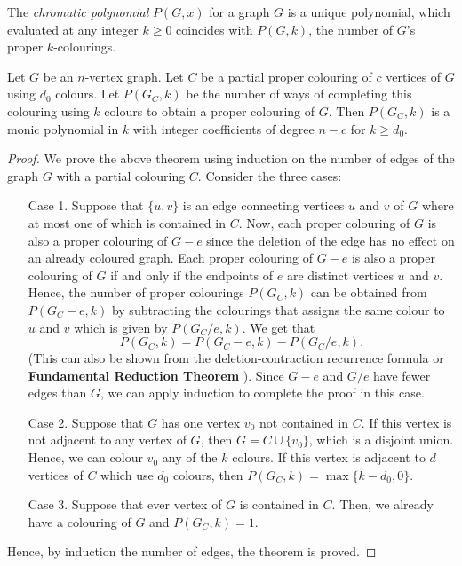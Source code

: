 \documentclass[../main.tex]{subfiles}
\begin{document}
    \begin{definition}
        The \emph{chromatic polynomial} $P(G,x)$ for a graph $G$ is a unique polynomial, which evaluated at any integer $k\geq0$ coincides with $P(G,k)$, the number of $G$'s proper $k$-colourings.
    \end{definition}
    \begin{theorem}
        Let $G$ be an $n$-vertex graph. Let $C$ be a partial proper colouring of $c$ vertices of $G$ using $d_0$ colours. Let $P(G_C,k)$ be the number of ways of completing this colouring using $k$ colours to obtain a proper colouring of $G$. Then $P(G_C,k)$ is a monic polynomial in $k$ with integer coefficients of degree $n-c$ for $k\geq d_0$.
    \end{theorem}
    \begin{proof}
        We prove the above theorem using induction on the number of edges of the graph $G$ with a partial colouring $C$. Consider the three cases:
        \begin{enumerate}
            \item[Case 1.] Suppose that $\{u,v\}$ is an edge connecting vertices $u$ and $v$ of $G$ where at most one of which is contained in $C$. Now, each proper colouring of $G$ is also a proper colouring of $G-e$ since the deletion of the edge has no effect on an already coloured graph. Each proper colouring of $G-e$ is also a proper colouring of $G$ if and only if the endpoints of $e$ are distinct vertices $u$ and $v$. Hence, the number of proper colourings $P(G_C, k)$ can be obtained from $P(G_C-e,k)$ by subtracting the colourings that assigns the same colour to $u$ and $v$ which is given by $P(G_C/e,k)$. We get that
            $$P(G_C,k) = P(G_C-e,k)-P(G_C/e, k).$$
            (This can also be shown from the deletion-contraction recurrence formula or \textbf{Fundamental Reduction Theorem} \cite{dong2005chromatic}). Since $G-e$ and $G/e$ have fewer edges than $G$, we can apply induction to complete the proof in this case.

            \item[Case 2.] Suppose that $G$ has one vertex $v_0$ not contained in $C$. If this vertex is not adjacent to any vertex of $G$, then $G=C\cup \{v_0\}$, which is a disjoint union. Hence, we can colour $v_0$ any of the $k$ colours. If this vertex is adjacent to $d$ vertices of $C$ which use $d_0$ colours, then $P(G_C,k)=\max\{k-d_0,0\}$.
            
            \item[Case 3.] Suppose that ever vertex of $G$ is contained in $C$. Then, we already have a colouring of $G$ and $P(G_C,k)=1$.
        \end{enumerate}
        Hence, by induction the number of edges, the theorem is proved.
    \end{proof}
\end{document}
